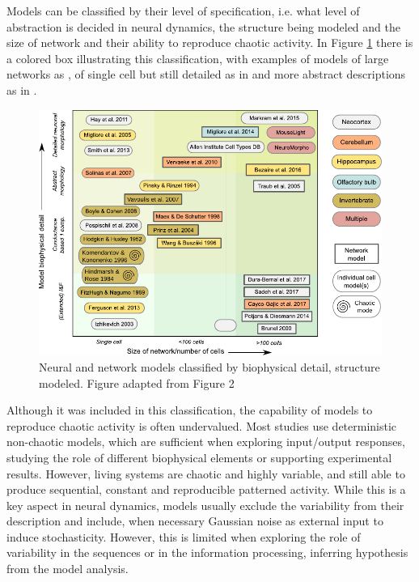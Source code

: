 Models can be classified by their level of specification, i.e. what level of abstraction is decided in neural dynamics, the structure being modeled and the size of network and their ability to reproduce chaotic activity. In Figure \ref{fig:models-classification} there is a colored box illustrating this classification, with examples of models of large networks as \cite{potjans2014,bezaire2016}, of single cell but still detailed as in \cite{smith2013} and more abstract descriptions as in \cite{izhikevich}.


\begin{figure}[bth!]
	\centering
	\includegraphics[width=\textwidth]{img/intro/models classification.pdf}
	\caption{Neural and network models classified by biophysical detail, structure modeled. Figure adapted from Figure 2 \cite{gleeson_open_2019}}
	\label{fig:models-classification}
\end{figure}

Although it was included in this classification, the capability of models to reproduce chaotic activity is often undervalued. Most studies use deterministic non-chaotic models, which are sufficient when exploring input/output responses, studying the role of different biophysical elements or supporting experimental results. However, living systems are chaotic and highly variable, and still able to produce sequential, constant and reproducible patterned activity. While this is a key aspect in neural dynamics, models usually exclude the variability from their description and include, when necessary Gaussian noise as external input to induce stochasticity. However, this is limited when exploring the role of variability in the sequences or in the information processing, inferring hypothesis from the model analysis. 

